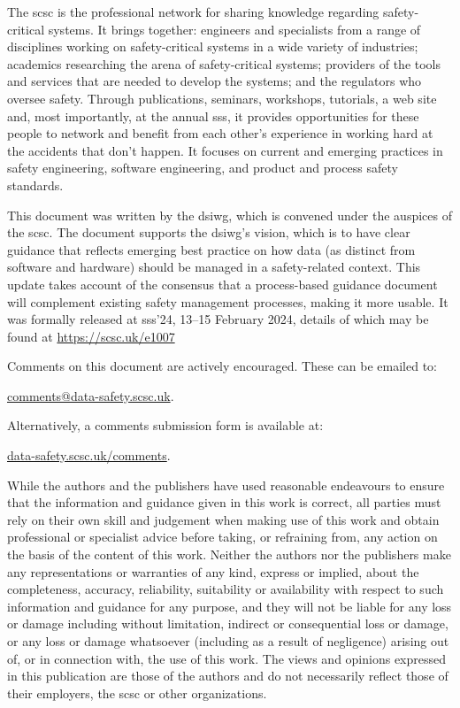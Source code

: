 The \gls{scsc} is the professional network for sharing knowledge regarding safety-critical systems. It brings together: engineers and specialists from a range of disciplines working on safety-critical systems in a wide variety of industries; academics researching the arena of safety-critical systems; providers of the tools and services that are needed to develop the systems; and the regulators who oversee safety. Through publications, seminars, workshops, tutorials, a web site and, most importantly, at the annual \gls{sss}, it provides opportunities for these people to network and benefit from each other’s experience in working hard at the accidents that don’t happen. It focuses on current and emerging practices in safety engineering, software engineering, and product and process safety standards.

This document was written by the \gls{dsiwg}, which is convened under the auspices of the \gls{scsc}. The document supports the \gls{dsiwg}'s vision, which is to have clear guidance that reflects emerging best practice on how data (as distinct from software and hardware) should be managed in a safety-related context. This update takes account of the consensus that a process-based guidance document will complement existing safety management processes, making it more usable. It was formally released at
\gls{sss}'24, 13--15 February 2024,
details of which may be found at
\href{https://scsc.uk/e1007}{https://scsc.uk/e1007}%

Comments on this document are actively encouraged. These can be emailed to: 
\begin{center}
  \href{mailto:comments@data-safety.scsc.uk}{comments@data-safety.scsc.uk}.
\end{center}

Alternatively, a comments submission form is available at:
\begin{center}
  \href{http://scsc.uk/data-comments.html}{data-safety.scsc.uk/comments}.
\end{center}

While the authors and the publishers have used reasonable endeavours to ensure that the information and guidance given in this work is correct, all parties must rely on their own skill and judgement when making use of this work and obtain professional or specialist advice before taking, or refraining from, any action on the basis of the content of this work. Neither the authors nor the publishers make any representations or warranties of any kind, express or implied, about the completeness, accuracy, reliability, suitability or availability with respect to such information and guidance for any purpose, and they will not be liable for any loss or damage including without limitation, indirect or consequential loss or damage, or any loss or damage whatsoever (including as a result of negligence) arising out of, or in connection with, the use of this work. The views and opinions expressed in this publication are those of the authors and do not necessarily reflect those of their employers, the \gls{scsc} or other organizations.

